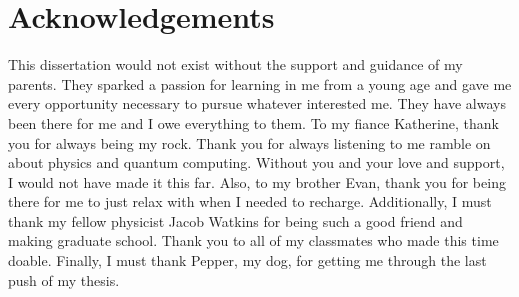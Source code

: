 \documentclass[10pt]{article}
\begin{document}
\makededicationpage

\clearpage

\chapter*{Acknowledgements}
\DoubleSpacing 
\quad This dissertation would not exist without the support and guidance of my parents. They sparked a passion for learning in me from a young age and gave me every opportunity necessary to pursue whatever interested me. They have always been there for me and I owe everything to them. To my fiance Katherine, thank you for always being my rock. Thank you for always listening to me ramble on about physics and quantum computing. Without you and your love and support, I would not have made it this far. Also, to my brother Evan, thank you for being there for me to just relax with when I needed to recharge. Additionally,  I must thank my fellow physicist Jacob Watkins for being such a good friend and making graduate school. Thank you to all of my classmates who made this time doable. Finally, I must thank Pepper, my dog, for getting me through the last push of my thesis.
\end{document}
